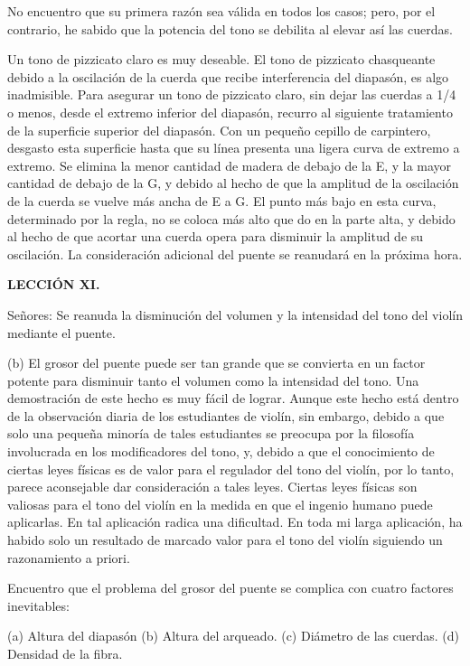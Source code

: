 \documentclass[12pt]{book}
\begin{document}
No encuentro que su primera razón sea válida en todos los casos; pero, por el contrario, he sabido que la potencia del tono se debilita al elevar así las cuerdas.

Un tono de pizzicato claro es muy deseable. El tono de pizzicato chasqueante debido a la oscilación de la cuerda que recibe interferencia del diapasón, es algo inadmisible. Para asegurar un tono de pizzicato claro, sin dejar las cuerdas a 1/4 o menos, desde el extremo inferior del diapasón, recurro al siguiente tratamiento de la superficie superior del diapasón. Con un pequeño cepillo de carpintero, desgasto esta superficie hasta que su línea presenta una ligera curva de extremo a extremo. Se elimina la menor cantidad de madera de debajo de la E, y la mayor cantidad de debajo de la G, y debido al hecho de que la amplitud de la oscilación de la cuerda se vuelve más ancha de E a G. El punto más bajo en esta curva, determinado por la regla, no se coloca más alto que do en la parte alta, y debido al hecho de que acortar una cuerda opera para disminuir la amplitud de su oscilación. La consideración adicional del puente se reanudará en la próxima hora.

\textbf{LECCIÓN XI.}

Señores: Se reanuda la disminución del volumen y la intensidad del tono del violín mediante el puente.

(b) El grosor del puente puede ser tan grande que se convierta en un factor potente para disminuir tanto el volumen como la intensidad del tono. Una demostración de este hecho es muy fácil de lograr. Aunque este hecho está dentro de la observación diaria de los estudiantes de violín, sin embargo, debido a que solo una pequeña minoría de tales estudiantes se preocupa por la filosofía involucrada en los modificadores del tono, y, debido a que el conocimiento de ciertas leyes físicas es de valor para el regulador del tono del violín, por lo tanto, parece aconsejable dar consideración a tales leyes. Ciertas leyes físicas son valiosas para el tono del violín en la medida en que el ingenio humano puede aplicarlas. En tal aplicación radica una dificultad. En toda mi larga aplicación, ha habido solo un resultado de marcado valor para el tono del violín siguiendo un razonamiento a priori.

Encuentro que el problema del grosor del puente se complica con cuatro factores inevitables:

(a) Altura del diapasón (b) Altura del arqueado. (c) Diámetro de las cuerdas. (d) Densidad de la fibra.
\end{document}
